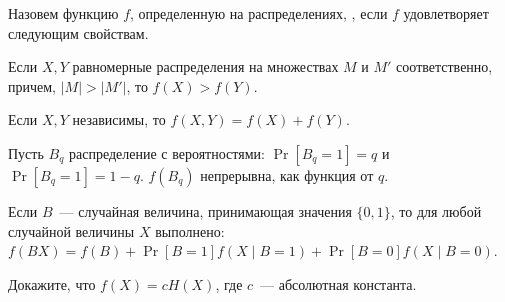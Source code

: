 Назовем функцию $f$, определенную на распределениях, , если $f$
удовлетворяет следующим свойствам.
\begin{enumtask}
    \item Если $X, Y$ равномерные распределения на множествах $M$ и $M'$ соответственно, причем, $|M| >
        |M'|$, то $f(X) > f(Y)$.
    \item Если $X, Y$ независимы, то $f(X, Y) = f(X) + f(Y)$.
    \item Пусть $B_q$ распределение с вероятностями: $\Pr[B_q = 1] = q$ и $\Pr[B_q = 1] = 1 -
        q$. $f(B_q)$ непрерывна, как функция от $q$.
    \item Если $B$~--- случайная величина, принимающая значения $\{0, 1\}$, то для любой случайной
        величины $X$ выполнено: $f(BX) = f(B) + \Pr[B = 1] f(X \mid B = 1) + \Pr[B = 0] f(X \mid B = 0)$.
\end{enumtask}

Докажите, что $f(X) = c H(X)$, где $c$~--- абсолютная константа.
